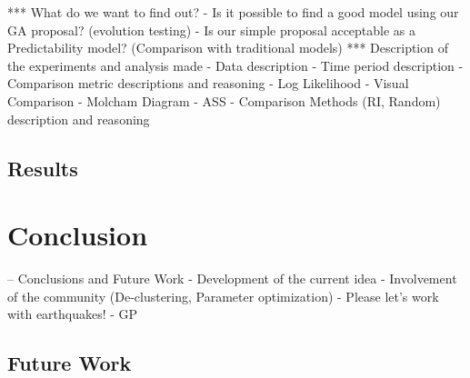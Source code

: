 \documentclass{sig-alternate}
\begin{document}
*** What do we want to find out?
    - Is it possible to find a good model using our GA proposal?
      (evolution testing)
    - Is our simple proposal acceptable as a Predictability model?
      (Comparison with traditional models)
*** Description of the experiments and analysis made
    - Data description
    - Time period description
    - Comparison metric descriptions and reasoning
      - Log Likelihood
      - Visual Comparison
      - Molcham Diagram
      - ASS
    - Comparison Methods (RI, Random) description and reasoning

\subsection{Results}

\section{Conclusion}
-- Conclusions and Future Work
   - Development of the current idea
   - Involvement of the community (De-clustering, Parameter optimization)
   - Please let's work with earthquakes!
   - GP
\subsection{Future Work}





\end{document}
